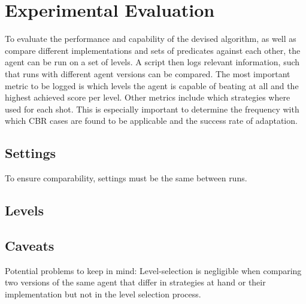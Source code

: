 \section{Experimental Evaluation}\label{sec:experimental}
To evaluate the performance and capability of the devised algorithm, as well as compare different implementations and sets of predicates against each other, the agent can be run on a set of levels.
A script then logs relevant information, such that runs with different agent versions can be compared.
The most important metric to be logged is which levels the agent is capable of beating at all and the highest achieved score per level.
Other metrics include which strategies where used for each shot.
This is especially important to determine the frequency with which \acs{CBR} cases are found to be applicable and the success rate of adaptation.


\subsection{Settings}\label{subsec:settings}
To ensure comparability, settings must be the same between runs.
\subsection{Levels}\label{subsec:levels}
\subsection{Caveats}\label{subsec:caveats}
Potential problems to keep in mind: Level-selection is negligible when comparing two versions of the same agent that differ in strategies at hand or their implementation but not in the level selection process.
